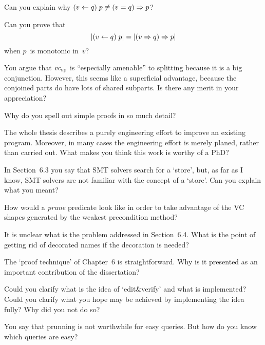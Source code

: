 
\Q Can you explain why $(v\gets q)\;p\not\equiv(v=q)\Rightarrow p$?

\Q Can you prove that $$|(v\gets q)\;p|=|(v\Rightarrow q)\Rightarrow p|$$ when $p$~is
monotonic in~$v$?

\Q You argue that ${\it vc}_{\rm sp}$ is ``especially amenable'' to
splitting because it is a big conjunction. However, this seems like a
superficial advantage, because the conjoined parts do have lots of shared
subparts.  Is there any merit in your appreciation?

\Q Why do you spell out simple proofs in so much detail?

\Q The whole thesis describes a purely engineering effort to improve an
existing program. Moreover, in many cases the engineering effort is merely
planed, rather than carried out. What makes you think this work is worthy
of a PhD?

\Q In Section~6.3 you say that SMT solvers search for a `store', but, as
far as I know, SMT solvers are not familiar with the concept of a `store'.
Can you explain what you meant?

\Q How would a {\it prune\/} predicate look like in order to take advantage
of the VC shapes generated by the weakest precondition method?

\Q It is unclear what is the problem addressed in Section~6.4. What is the
point of getting rid of decorated names if the decoration is needed?


\Q The `proof technique' of Chapter~6 is straightforward. Why is it
presented as an important contribution of the dissertation?


\Q Could you clarify what is the idea of `edit\&verify' and what is
implemented? Could you clarify what you hope may be achieved by
implementing the idea fully? Why did you not do so?

\Q You say that prunning is not worthwhile for easy queries. But how do you
know which queries are easy?


